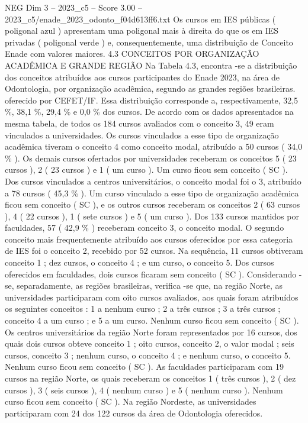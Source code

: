 \begin{textsample}{NEG Dim 3 – 2023\_c5 – Score 3.00 – 2023\_c5/enade\_2023\_odonto\_f04d613ff6.txt}
Os cursos em IES públicas ( poligonal azul ) apresentam uma poligonal mais à direita do que os em IES privadas ( poligonal verde ) e, consequentemente, uma distribuição de Conceito Enade com valores maiores. 4.3 CONCEITOS POR ORGANIZAÇÃO ACADÊMICA E GRANDE REGIÃO Na Tabela 4.3, encontra -se a distribuição dos conceitos atribuídos aos cursos participantes do Enade 2023, na área de Odontologia, por organização acadêmica, segundo as grandes regiões brasileiras. oferecido por CEFET/IF.
Essa distribuição corresponde a, respectivamente, 32,5 \%, 38,1 \%, 29,4 \% e 0,0 \% dos cursos.
De acordo com os dados apresentados na mesma tabela, de todos os 184 cursos avaliados com o conceito 3, 49 eram vinculados a universidades.
Os cursos vinculados a esse tipo de organização acadêmica tiveram o conceito 4 como conceito modal, atribuído a 50 cursos ( 34,0 \% ).
Os demais cursos ofertados por universidades receberam os conceitos 5 ( 23 cursos ), 2 ( 23 cursos ) e 1 ( um curso ).
Um curso ficou sem conceito ( SC ).
Dos cursos vinculados a centros universitários, o conceito modal foi o 3, atribuído a 78 cursos ( 45,3 \% ).
Um curso vinculado a esse tipo de organização acadêmica ficou sem conceito ( SC ), e os outros cursos receberam os conceitos 2 ( 63 cursos ), 4 ( 22 cursos ), 1 ( sete cursos ) e 5 ( um curso ).
Dos 133 cursos mantidos por faculdades, 57 ( 42,9 \% ) receberam conceito 3, o conceito modal.
O segundo conceito mais frequentemente atribuído aos cursos oferecidos por essa categoria de IES foi o conceito 2, recebido por 52 cursos.
Na sequência, 11 cursos obtiveram conceito 1 ; dez cursos, o conceito 4 ; e um curso, o conceito 5.
Dos cursos oferecidos em faculdades, dois cursos ficaram sem conceito ( SC ).
Considerando -se, separadamente, as regiões brasileiras, verifica -se que, na região Norte, as universidades participaram com oito cursos avaliados, aos quais foram atribuídos os seguintes conceitos : 1 a nenhum curso ; 2 a três cursos ; 3 a três cursos ; conceito 4 a um curso ; e 5 a um curso.
Nenhum curso ficou sem conceito ( SC ).
Os centros universitários da região Norte foram representados por 16 cursos, dos quais dois cursos obteve conceito 1 ; oito cursos, conceito 2, o valor modal ; seis cursos, conceito 3 ; nenhum curso, o conceito 4 ; e nenhum curso, o conceito 5.
Nenhum curso ficou sem conceito ( SC ).
As faculdades participaram com 19 cursos na região Norte, os quais receberam os conceitos 1 ( três cursos ), 2 ( dez cursos ), 3 ( seis cursos ), 4 ( nenhum curso ) e 5 ( nenhum curso ).
Nenhum curso ficou sem conceito ( SC ).
Na região Nordeste, as universidades participaram com 24 dos 122 cursos da área de Odontologia oferecidos.

\end{textsample}
